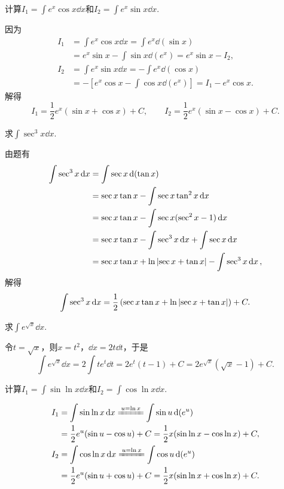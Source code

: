 \begin{example}
计算\(I_1 = \int e^x \cos x\dd{x}\)和\(I_2 = \int e^x \sin x\dd{x}\).
\begin{solution}
因为\begin{align*}
I_1 &= \int e^x \cos x\dd{x}
= \int e^x \dd(\sin x) \\
&= e^x \sin x - \int \sin x \dd(e^x)
= e^x \sin x - I_2, \\
I_2 &= \int e^x \sin x\dd{x}
= -\int e^x \dd(\cos x) \\
&= -\left[ e^x \cos x - \int \cos x \dd(e^x) \right]
= I_1 - e^x \cos x.
\end{align*}解得\[
I_1 = \frac{1}{2} e^x (\sin x + \cos x) + C,
\qquad
I_2 = \frac{1}{2} e^x (\sin x - \cos x) + C.
\]
\end{solution}
\end{example}

\begin{example}
求\(\int \sec^3 x \dd{x}\).
\begin{solution}
由题有\begin{align*}
\int \sec^3 x \dd{x}
&= \int \sec x \dd(\tan x) \\
&= \sec x \tan x - \int \sec x \tan^2 x \dd{x} \\
&= \sec x \tan x - \int \sec x (\sec^2 x - 1) \dd{x} \\
&= \sec x \tan x - \int \sec^3 x \dd{x} + \int \sec x \dd{x} \\
&= \sec x \tan x + \ln\abs{\sec x + \tan x} - \int \sec^3 x \dd{x},
\end{align*}解得\[
\int \sec^3 x \dd{x}
= \frac{1}{2} \left(
	\sec x \tan x
	+ \ln\abs{\sec x + \tan x}
\right) + C.
\]
\end{solution}
\end{example}

\begin{example}
求\(\int e^{\sqrt{x}} \dd{x}\).
\begin{solution}
令\(t = \sqrt{x}\)，则\(x = t^2\)，\(\dd{x} = 2t\dd{t}\)，于是\[
\int e^{\sqrt{x}} \dd{x}
= 2 \int t e^t \dd{t}
= 2 e^t (t-1) + C
= 2 e^{\sqrt{x}} (\sqrt{x}-1) + C.
\]
\end{solution}
\end{example}

\begin{example}
计算\(I_1 = \int \sin{\ln{x}} \dd{x}\)和\(I_2 = \int \cos{\ln{x}} \dd{x}\).
\begin{solution}
\begin{align*}
I_1
&= \int \sin{\ln x}\dd{x}
\xlongequal{u = \ln x} \int \sin u \dd(e^u) \\
&= \frac{1}{2} e^u (\sin u - \cos u) + C
= \frac{1}{2} x (\sin{\ln x} - \cos{\ln x}) + C, \\
I_2
&= \int \cos{\ln x}\dd{x}
\xlongequal{u = \ln x} \int \cos u \dd(e^u) \\
&= \frac{1}{2} e^u (\sin u + \cos u) + C
= \frac{1}{2} x (\sin{\ln x} + \cos{\ln x}) + C.
\end{align*}
\end{solution}
\end{example}

